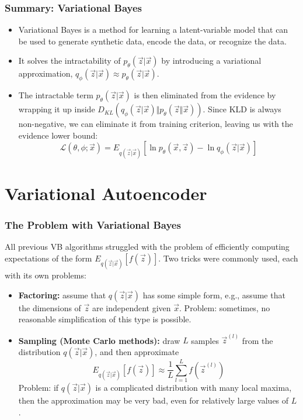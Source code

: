\documentclass{beamer}
\begin{document}
\begin{frame}
  \frametitle{Summary: Variational Bayes}

  \begin{itemize}
  \item Variational Bayes is a method for learning a latent-variable
    model that can be used to generate synthetic data, encode the
    data, or recognize the data.
  \item It solves the intractability of $p_\theta(\vec{z}|\vec{x})$ by
    introducing a variational approximation,
    $q_\phi(\vec{z}|\vec{x})\approx p_\theta(\vec{z}|\vec{x})$.
  \item The intractable term $p_\theta(\vec{z}|\vec{x})$ is then
    eliminated from the evidence by wrapping it up inside
    $D_{KL}\left(q_\phi(\vec{z}|\vec{x})\Vert
    p_\theta(\vec{z}\Vert\vec{x})\right)$.  Since KLD is always
    non-negative, we can eliminate it from training criterion, leaving
    us with the evidence lower bound:
    \begin{displaymath}
      {\mathcal L}\left(\theta,\phi;\vec{x}\right) =
      E_{q(\vec{z}|\vec{x})}\left[\ln p_\theta(\vec{x},\vec{z})-\ln q_\phi(\vec{z}|\vec{x})\right]
    \end{displaymath}
  \end{itemize}
\end{frame}




\section{Variational Autoencoder}
\setcounter{subsection}{1}

\begin{frame}
  \frametitle{The Problem with Variational Bayes}

  All previous VB algorithms struggled with the problem of efficiently
  computing expectations of the form
  $E_{q(\vec{z}|\vec{x})}\left[f(\vec{z})\right]$.
  Two tricks were commonly used, each with its own  problems:
  \begin{itemize}
  \item {\bf Factoring:} assume that $q(\vec{z}|\vec{x})$ has some
    simple form, e.g., assume that the dimensions of $\vec{z}$ are
    independent given $\vec{x}$.  Problem: sometimes, no reasonable
    simplification of this type is possible.
  \item {\bf Sampling (Monte Carlo methods):} draw $L$ samples
    $\vec{z}^{(l)}$ from the distribution $q(\vec{z}|\vec{x})$, and
    then approximate
    \begin{displaymath}
      E_{q(\vec{z}|\vec{x})}\left[f(\vec{z})\right]\approx
      \frac{1}{L}\sum_{l=1}^L f(\vec{z}^{(l)})
    \end{displaymath}
    Problem: if $q(\vec{z}|\vec{x})$ is a complicated distribution
    with many local maxima, then the approximation may be very bad,
    even for relatively large values of $L$.
  \end{itemize}
\end{frame}
\end{document}
